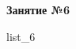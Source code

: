 \documentclass[12pt, a4paper]{article}
\begin{document}
	\begin{center}
		\large
		\textbf{Занятие №6}
	\end{center}
	{list_6}
\end{document}
